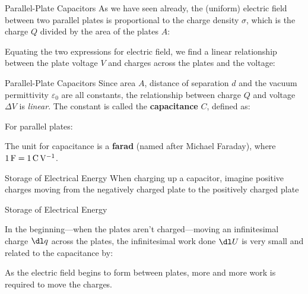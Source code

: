 \documentclass[12pt,aspectratio=169]{beamer}
\begin{document}
\begin{frame}{Parallel-Plate Capacitors}
  As we have seen already, the (uniform) electric field between two parallel
  plates is proportional to the charge density $\sigma$, which is the charge
  $Q$ divided by the area of the plates $A$:

  
  Equating the two expressions for electric field, we find a linear
  relationship between the plate voltage $V$ and charges across the
  plates and the voltage:

\end{frame}



\begin{frame}{Parallel-Plate Capacitors}
  Since area $A$, distance of separation $d$ and the vacuum permittivity
  $\varepsilon_0$ are all constants, the relationship between charge $Q$ and
  voltage $\Delta V$ is \emph{linear}. The constant is called the
  \textbf{capacitance} $C$, defined as:


  For parallel plates:


  The unit for capacitance is a \textbf{farad} (named after Michael Faraday),
  where $\SI1\farad=\SI1{\coulomb\per\volt}$.
\end{frame}



\begin{frame}{Storage of Electrical Energy}
  When charging up a capacitor, imagine positive charges moving from the
  negatively charged plate to the positively charged plate
  \begin{center}
  \end{center}
\end{frame}



\begin{frame}{Storage of Electrical Energy}
  \begin{center}
  \end{center}
  In the beginning---when the plates aren't charged---moving an infinitesimal
  charge $\dl q$ across the plates, the infinitesimal work done $\dl U$ is very
  small and related to the capacitance by:

  
  As the electric field begins to form between plates, more and more work
  is required to move the charges.
\end{frame}
\end{document}
